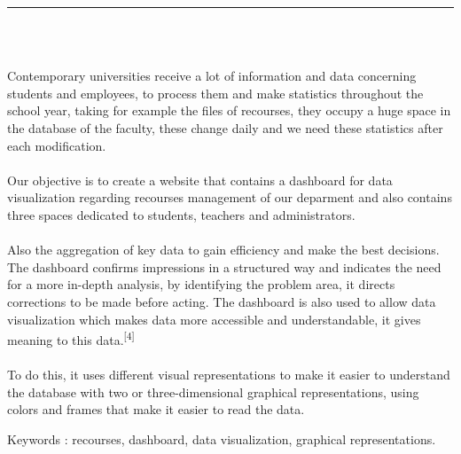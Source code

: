 \documentclass[12pt]{report}
\newenvironment{changemargin}[2]{%
\begin{list}{}{%
\setlength{\topsep}{0pt}%
\setlength{\leftmargin}{#1}%
\setlength{\rightmargin}{#2}%
\setlength{\listparindent}{\parindent}%
\setlength{\itemindent}{\parindent}%
\setlength{\parsep}{\parskip}%
}%
\item[]}{\end{list}}
\begin{document}
\newpage

\vspace*{0.2in}

\thispagestyle{empty}

\begin{center}
    {\color{Blue} \rule{3in}{1.4mm} }\\
    \vspace{0.1in}
    \scshape{\fontsize{34}{46}{\bfseries{\color{Blue}{Abstract}}}}
    \\
    \vspace{0.6in}
\end{center}
\begin{changemargin}{0.9cm}{0.9cm}
Contemporary universities receive a lot of information and data concerning students and employees, to process them and make statistics throughout the school year, taking for example the files of recourses, they occupy a huge space in the database of the faculty, these change daily and we need these statistics after each modification.
\\\\
Our objective is to create a website that contains a dashboard for data visualization regarding recourses management of our deparment and also contains three spaces dedicated to students, teachers and administrators.
\\\\
  Also the aggregation of key data to gain efficiency and make the best decisions. The dashboard confirms impressions in a structured way and indicates the need for a more in-depth analysis, by identifying the problem area, it directs corrections to be made before acting. The dashboard is also used to allow data visualization which makes data more accessible and understandable, it gives meaning to this data.\textsuperscript{[4]}
\\\\
To do this, it uses different visual representations to make it easier to understand the database with two or three-dimensional graphical representations, using colors and frames that make it easier to read the data.
\end{changemargin}

\vspace{1in}

\begin{changemargin}{0.9cm}{0.9cm}
Keywords : recourses, dashboard, data visualization, graphical representations.
\end{changemargin}
\end{document}
